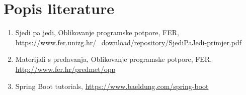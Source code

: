 \chapter*{Popis literature}
%	 	
%	
		
		
		\begin{enumerate}
			
			\item Sjedi pa jedi, Oblikovanje programske potpore, FER, \url {https://www.fer.unizg.hr/\_download/repository/SjediPaJedi-primjer.pdf}
			
			\item Materijali s predavanja, Oblikovanje programske potpore, FER, \url{http://www.fer.hr/predmet/opp}
			
			\item Spring Boot tutorials, \url{https://www.baeldung.com/spring-boot} 
		\end{enumerate}
		
		 